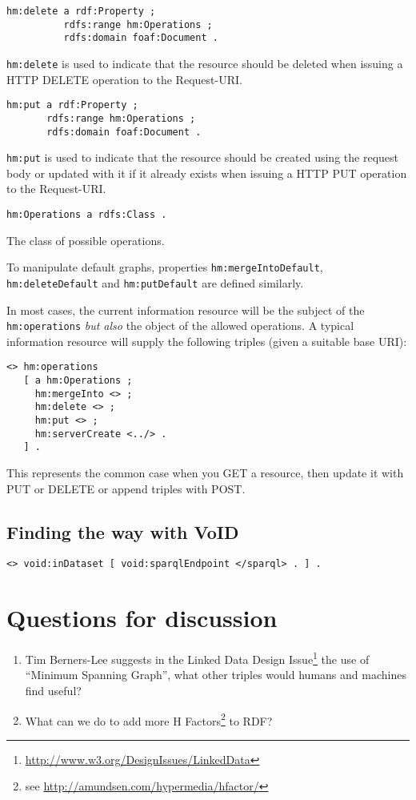 \documentclass{llncs}
\begin{document}
\begin{verbatim}
hm:delete a rdf:Property ;
          rdfs:range hm:Operations ;
          rdfs:domain foaf:Document .
\end{verbatim}
\texttt{hm:delete} is used to indicate that the resource should be
deleted when issuing a HTTP DELETE operation to the Request-URI. 

\begin{verbatim}
hm:put a rdf:Property ;
       rdfs:range hm:Operations ;
       rdfs:domain foaf:Document .
\end{verbatim}
\texttt{hm:put} is used to indicate that the resource should be
created using the request body or updated with it if it already exists
when issuing a HTTP PUT operation to the Request-URI.

\begin{verbatim}
hm:Operations a rdfs:Class .
\end{verbatim}
The class of possible operations.

To manipulate default graphs, properties \texttt{hm:mergeIntoDefault},
\texttt{hm:deleteDefault} and \texttt{hm:putDefault} are defined
similarly.

In most cases, the current information resource will be the subject of
the \texttt{hm:operations} \emph{but also} the object of the allowed
operations. A typical information resource will supply the following
triples (given a suitable base URI):

\begin{verbatim}
<> hm:operations
   [ a hm:Operations ;
     hm:mergeInto <> ;
     hm:delete <> ;
     hm:put <> ;
     hm:serverCreate <../> .
   ] .
\end{verbatim}
This represents the common case when you GET a resource, then update
it with PUT or DELETE or append triples with POST.


\subsection{Finding the way with VoID}

\begin{verbatim}
<> void:inDataset [ void:sparqlEndpoint </sparql> . ] .
\end{verbatim}

\section{Questions for discussion}

\begin{enumerate}
\item Tim Berners-Lee suggests in the Linked Data Design
  Issue\footnote{\url{http://www.w3.org/DesignIssues/LinkedData}} the
  use of ``Minimum Spanning Graph'', what other triples would humans
  and machines find useful?

\item What can we do to add more H Factors\footnote{see
  \url{http://amundsen.com/hypermedia/hfactor/}} to RDF?

\end{enumerate}



%
%

\end{document}
